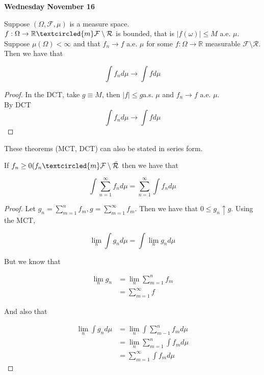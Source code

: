 \documentclass[11pt,fleqn]{book} %
\begin{document}
		
\textbf{Wednesday November 16}\\

\begin{theorem}
	Suppose $(\Omega, \mathcal{F}, \mu)$ is a measure space. \\

	$f: \Omega \rightarrow \mathbb{R} \textcircled{m} \mathcal{F}\setminus\mathcal{R} $ is bounded, that is $|f(\omega)| \leq M$ a.e. $\mu$. \\

	Suppose $\mu(\Omega) < \infty$ and that $f_n \rightarrow f$ a.e. $\mu$ for some $f: \Omega \rightarrow \mathbb{R}$ measurable $\mathcal{F} \setminus \mathcal{R}$. Then we have that

			$$\int f_n d\mu \rightarrow \int f d\mu $$


\end{theorem}

\begin{proof}
	In the DCT, take $g \equiv M$, then $|f| \leq g $a.s. $\mu$ and $f_n \rightarrow f$ a.e. $\mu$. \\

	By DCT 
			$$\int f_n d\mu \rightarrow \int f d\mu $$
\end{proof}

These theorems (MCT, DCT) can also be stated in series form. 

\begin{theorem}
	If $f_n \geq 0 (f_n \textcircled{m} \mathcal{F} \setminus \mathcal{\bar{R}}$ then we have that 

			$$\int \sum^\infty_{n=1} f_n d\mu = \sum^\infty_{n=1} \int f_n d\mu $$
\end{theorem}

\begin{proof}
	Let $g_n = \sum^n_{m=1} f_m, g = \sum^\infty_{m=1} f_m$. Then we have that $0 \leq g_n \uparrow g$. Using the MCT, 

			$$\lim_n \int g_n d\mu = \int \lim_n g_n d\mu $$

	But we know that 

		\begin{align*}
			\lim_n g_n &= \lim_n \sum^n_{m=1} f_m\\
					&= \sum^\infty_{m=1} f
		\end{align*}

	And also that 

			\begin{align*}
				\lim_n \int g_n d\mu &= \lim_n \int \sum^n_{m-1} f_m d\mu\\
						&= \lim_n \sum^n_{m=1 }\int f_m d\mu\\
						&= \sum^\infty_{m=1} \int f_m d\mu
			\end{align*}
\end{proof}
\end{document}
